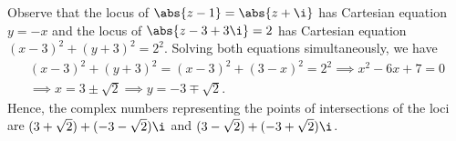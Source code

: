 \begin{solution}
\begin{center}
    \end{center}

    Observe that the locus of $\abs{z - 1} = \abs{z + \i}$ has Cartesian equation $y = -x$ and the locus of $\abs{z - 3 + 3\i} = 2$ has Cartesian equation $(x-3)^2 + (y+3)^2 = 2^2$. Solving both equations simultaneously, we have
    \begin{gather*}
        (x-3)^2 + (y+3)^2 = (x-3)^2 + (3-x)^2 = 2^2 \implies x^2 - 6x + 7 = 0\\
        \implies x = 3 \pm \sqrt2 \implies y = -3 \mp \sqrt2.
    \end{gather*}
    Hence, the complex numbers representing the points of intersections of the loci are $(3 + \sqrt2) + (-3 - \sqrt2)\i$ and $(3 - \sqrt2) + (-3 + \sqrt2)\i$.
\end{solution}

